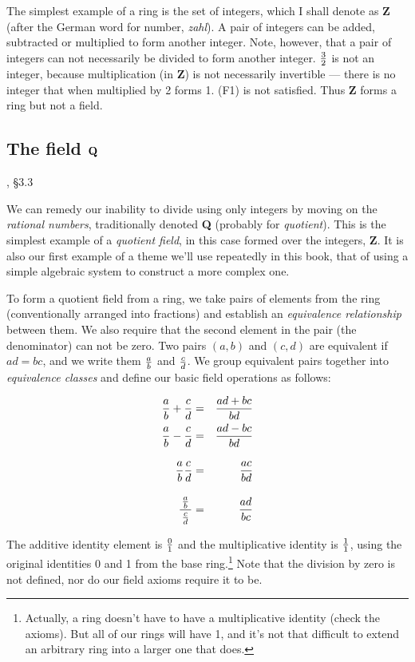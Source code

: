 The simplest example of a ring is the set of integers, which I shall
denote as {\bf Z} (after the German word for number, {\it zahl}).  A pair
of integers can be added, subtracted or multiplied to form another
integer.  Note, however, that a pair of integers can not necessarily
be divided to form another integer.  $3 \over 2$ is not an integer,
because multiplication (in {\bf Z}) is not necessarily invertible ---
there is no integer that when multiplied by 2 forms 1.
(F1) is not satisfied.
Thus {\bf Z} forms a ring but not a field.

\subsection*{\qquad The field ${\bf Q}$}
, \S3.3

We can remedy our inability to divide using only integers
by moving on the {\it rational numbers},
traditionally denoted {\bf Q} (probably for {\it quotient}).  This is the
simplest example of a {\it quotient field}, in this case formed over
the integers, {\bf Z}.  It is also our first example of a theme
we'll use repeatedly in this book, that of using a simple
algebraic system to construct a more complex one.

To form a quotient field from a ring, we take pairs of elements from
the ring (conventionally arranged into fractions) and establish an
{\it equivalence relationship} between them.  We also require that the
second element in the pair (the denominator) can not be zero.  Two
pairs $(a,b)$ and $(c,d)$ are equivalent if $ad=bc$, and we write them
$a\over b$ and $c\over d$.  We group equivalent pairs together into
{\it equivalence classes} and define our basic field operations as
follows:

\begin{center}
\begin{eqnarray*}
{a\over b} + {c\over d} &=& {{ad+bc}\over{bd}} \cr
{a\over b} - {c\over d} &=& {{ad-bc}\over{bd}} \cr
{a\over b} {c\over d} &=& {{ac}\over{bd}} \vbox to20pt{}\cr
{\,{a\over b}\, \over {c \over d}} &=& {{ad}\over{bc}} \vbox to24pt{}\cr
\end{eqnarray*}
\end{center}

The additive identity element is $0\over1$ and the multiplicative
identity is $1\over1$, using the original identities 0 and 1 from the
base ring.\footnote{Actually, a ring doesn't have to have a
multiplicative identity (check the axioms).  But all of
our rings will have 1, and it's not that difficult to extend
an arbitrary ring into a larger one that does.}
Note that the division by zero is not defined, nor do
our field axioms require it to be.


